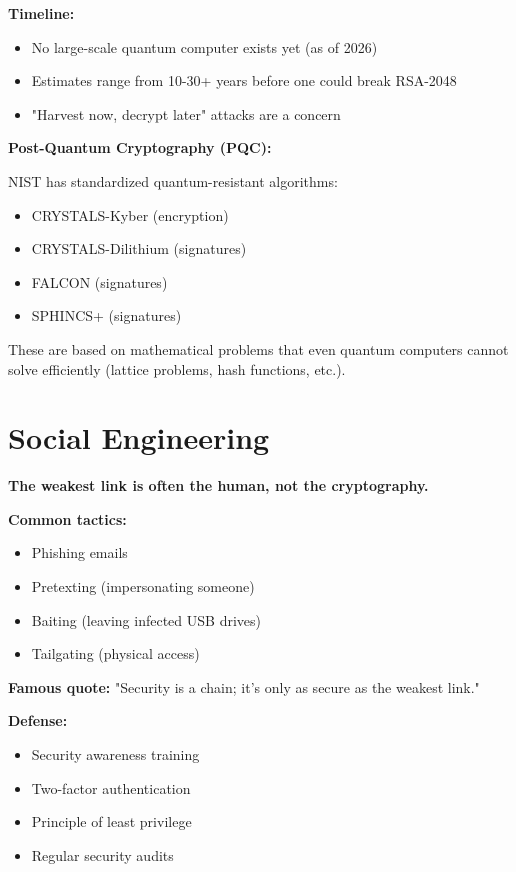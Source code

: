\documentclass[11pt,a4paper]{report}
\begin{document}
\textbf{Timeline:}
\begin{itemize}
\item No large-scale quantum computer exists yet (as of 2026)
\item Estimates range from 10-30+ years before one could break RSA-2048
\item "Harvest now, decrypt later" attacks are a concern
\end{itemize}

\textbf{Post-Quantum Cryptography (PQC):}

NIST has standardized quantum-resistant algorithms:
\begin{itemize}
\item CRYSTALS-Kyber (encryption)
\item CRYSTALS-Dilithium (signatures)
\item FALCON (signatures)
\item SPHINCS+ (signatures)
\end{itemize}

These are based on mathematical problems that even quantum computers cannot solve efficiently (lattice problems, hash functions, etc.).

\section{Social Engineering}

\textbf{The weakest link is often the human, not the cryptography.}

\textbf{Common tactics:}
\begin{itemize}
\item Phishing emails
\item Pretexting (impersonating someone)
\item Baiting (leaving infected USB drives)
\item Tailgating (physical access)
\end{itemize}

\textbf{Famous quote:} "Security is a chain; it's only as secure as the weakest link."

\textbf{Defense:}
\begin{itemize}
\item Security awareness training
\item Two-factor authentication
\item Principle of least privilege
\item Regular security audits
\end{itemize}
\end{document}
